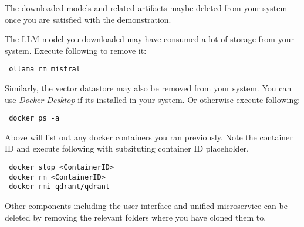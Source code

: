 The downloaded models and related artifacts maybe deleted from your system once you are satisfied with the demonstration.

The LLM model you downloaded may have consumed a lot of storage from your system.
Execute following to remove it:
\begin{lstlisting}
 ollama rm mistral
\end{lstlisting}

Similarly, the vector datastore may also be removed from your system. You can use \emph{Docker Desktop} if its installed in your system.
Or otherwise execute following:

\begin{lstlisting}
 docker ps -a
\end{lstlisting}

Above will list out any docker containers you ran previously. Note the container ID and execute following with subsituting container ID placeholder.

\begin{lstlisting}
 docker stop <ContainerID>
 docker rm <ContainerID>
 docker rmi qdrant/qdrant
\end{lstlisting}

Other components including the user interface and unified microservice can be deleted by removing the relevant folders where you have cloned them to.